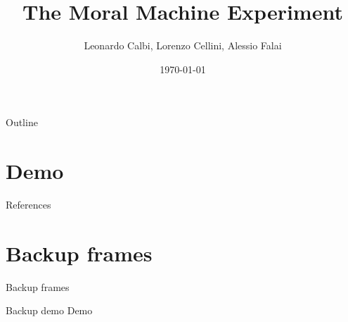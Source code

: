 \documentclass[aspectratio=169]{beamer}
\title[MME]{The Moral Machine Experiment}
\author{Leonardo Calbi, Lorenzo Cellini, Alessio Falai\\}
\institute{Alma Mater Studiorum - University of Bologna}
\date{\today}
\begin{document}
\maketitle

\begin{frame}{Outline}
    \tableofcontents
\end{frame}

\section{Demo}
\begin{frame}
    \cite{mme}
\end{frame}

\appendix
\begin{frame}{References}
    \printbibliography
\end{frame}

\section*{Backup frames}
\begin{frame}
    \centering
    \vfill
    {\fontsize{40}{50}\selectfont Backup frames}
    \vfill
\end{frame}

\begin{frame}{Backup demo}
    Demo
\end{frame}
\end{document}
